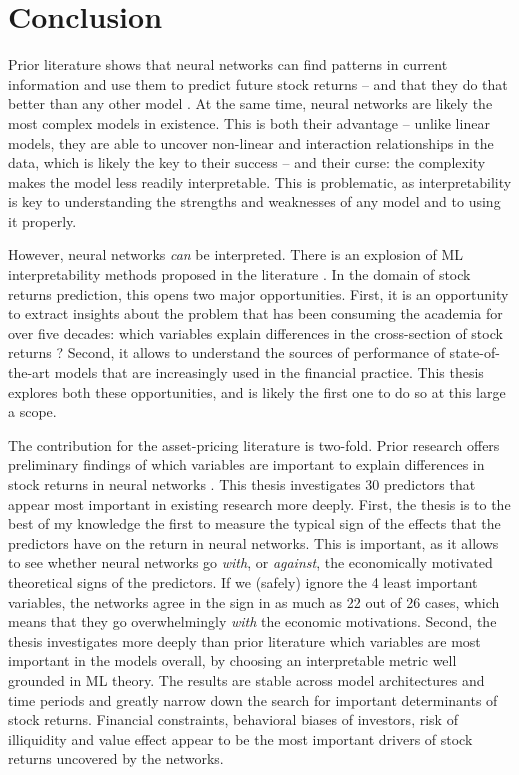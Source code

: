 \chapter{Conclusion}
\label{con}

Prior literature shows that neural networks can find patterns in current information and use them to predict future stock returns -- and that they do that better than any other model \citep[e.g.][]{gu2020empirical, tobek2020does}. At the same time, neural networks are likely the most complex models in existence. This is both their advantage -- unlike linear models, they are able to uncover non-linear and interaction relationships in the data, which is likely the key to their success  \citep[e.g.][]{bryzgalova2019forest, gu2020empirical} -- and their curse: the complexity makes the model less readily interpretable. This is problematic, as interpretability is key to understanding the strengths and weaknesses of any model and to using it properly. 

However, neural networks \textit{can} be interpreted. There is an explosion of ML interpretability methods proposed in the literature \citep[e.g.][]{molnar2020interpretable}. In the domain of stock returns prediction, this opens two major opportunities. First, it is an opportunity to extract insights about the problem that has been consuming the academia for over five decades: which variables explain differences in the cross-section of stock returns \citep{cochrane2011presidential}? Second, it allows to understand the sources of performance of state-of-the-art models that are increasingly used in the financial practice. This thesis explores both these opportunities, and is likely the first one to do so at this large a scope.   

The contribution for the asset-pricing literature is two-fold. Prior research offers preliminary findings of which variables are important to explain differences in stock returns in neural networks \citep{gu2020empirical, tobek2020does}. This thesis investigates 30 predictors that appear most important in existing research more deeply. First, the thesis is to the best of my knowledge the first to measure the typical sign of the effects that the predictors have on the return in neural networks. This is important, as it allows to see whether neural networks go \textit{with}, or \textit{against}, the economically motivated theoretical signs of the predictors. If we (safely) ignore the 4 least important variables, the networks agree in the sign in as much as 22 out of 26 cases, which means that they go overwhelmingly \textit{with} the economic motivations. Second, the thesis investigates more deeply than prior literature which variables are most important in the models overall, by choosing an interpretable metric well grounded in ML theory. The results are stable across model architectures and time periods and greatly narrow down the search for important determinants of stock returns. Financial constraints, behavioral biases of investors, risk of illiquidity and value effect appear to be the most important drivers of stock returns uncovered by the networks. 

